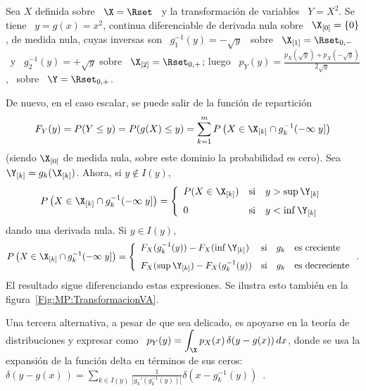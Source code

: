 \begin{ejemplo}
\label{Ej:MP:TransformacionNoBiyectiva}
%
Sea $X$ definida sobre \ $\X =  \Rset$ \ y la transformaci\'on de variables \ $Y
= X^2$.  Se  tiene \ $y =  g(x) = x^2$, continua diferenciable  de derivada nula
sobre \ $\X_{[0]} = \{ 0 \}$,  de medida nula, cuyas inversas son \ $g_1^{-1}(y)
= - \sqrt{y}$ \ sobre \ $\X_{[1]}  = \Rset_{0,-}$ \ y \ $g_2^{-1}(y)
=   +  \sqrt{y}$   sobre  \   $\X_{[2]}  =   \Rset_{0,+}$;  luego   \   $p_Y(y)  =
\frac{p_X(\sqrt{y}) + p_X(-\sqrt{y})}{2 \sqrt{y}}$, \ sobre \ $\Y = \Rset_{0,+}$.
\end{ejemplo}

De nuevo, en el caso escalar, se puede salir de la funci\'on de repartici\'on
%
\[
F_Y(y) =  P(Y \le y) = P(  g(X) \le y )  = \sum_{k=1}^m P\left( X  \in \X_{[k]} \cap
  g_k^{-1}(-\infty \; y] \right)
\]
%
(siendo  $\X_{[0]}$  de medida  nula,  sobre  este  dominio la  probabilidad  es
cero). Sea $\Y_{[k]} = g_k(\X_{[k]})$. Ahora, si $y \notin I(y)$,
%
\[
P\left(   X   \in  \X_{[k]}   \cap   g_k^{-1}(-\infty  \;   y]  \right)   =
\left\{\begin{array}{lll}
%
P(X \in \X_{[k]}) & \mbox{si} & y > \sup \Y_{[k]}\\[2.5mm]
%
0 & \mbox{si} & y < \inf \Y_{[k]}
\end{array}\right.
\]
%
dando una derivada nula. Si $y \in I(y)$,
%
\[
P\left(   X   \in  \X_{[k]}   \cap   g_k^{-1}(-\infty  \;   y]  \right)   =
\left\{\begin{array}{lll}
%
F_X(g_k^{-1}(y)) - F_X(\inf \Y_{[k]}) & \mbox{si} & g_k \quad \mbox{es creciente}\\[2.5mm]
%
F_X(\sup \Y_{[k]}) - F_X(g_k^{-1}(y))  & \mbox{si} & g_k \quad \mbox{es decreciente}
\end{array}\right..
\]
%
El resultado sigue diferenciando estas expresiones. Se ilustra esto tambi\'en en
la figura~\ref{Fig:MP:TransformacionVA}.

Una tercera alternativa, a pesar de que sea delicado, es apoyarse en la teor\'ia
de distribuciones  y expresar como \  $\displaystyle p_Y(y) =  \int_\X p_X(x) \,
\delta(y-g(x)) \,  dx$, donde  se usa  la expansi\'on de  la funci\'on  delta en
t\'erminos de sus ceros:  \ $\delta(y-g(x)\,)= \sum_{k \in I(y)} \frac{1}{\left|
    g_k'\left(          g_k^{-1}          (y)          \right)          \right|}
\delta(x-g_k^{-1}(y))$~\cite{ManWol95}.


